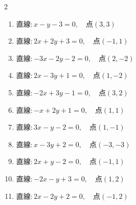 \begin{multicols}{2}
\begin{enumerate}

  \item $直線:x-y-3=0,\quad 点 ( 3, 3 )$


  \item $直線:2x+2y+3=0,\quad 点 ( -1, 1 )$


  \item $直線:-3x-2y-2=0,\quad 点 ( 2, -2 )$


  \item $直線:2x-3y+1=0,\quad 点 ( 1, -2 )$


  \item $直線:-2x+3y-1=0,\quad 点 ( 3, 2 )$


  \item $直線:-x+2y+1=0,\quad 点 ( 1, 1 )$


  \item $直線:3x-y-2=0,\quad 点 ( 1, -1 )$


\columnbreak %

  \item $直線:x-3y+2=0,\quad 点 ( -3, -3 )$


  \item $直線:2x+y-2=0,\quad 点 ( -1, 1 )$


  \item $直線:-2x-y+3=0,\quad 点 ( 1, 2 )$


  \item $直線:2x-2y+2=0,\quad 点 ( -1, 2 )$



\end{enumerate}
\end{multicols}
